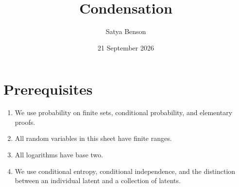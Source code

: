 \documentclass[11pt]{article}
\title{Condensation}
\author{Satya Benson}
\date{21 September 2026}
\begin{document}
\maketitle


\section{Prerequisites}
\label{sec:prerequisites}
\begin{enumerate}

\item We use probability on finite sets, conditional probability, and elementary
proofs.
\item All random variables in this sheet have finite ranges.
\item All logarithms
have base two.


\item We use conditional entropy,
conditional independence, and the distinction between an individual latent and
a collection of latents.
\end{enumerate}
\end{document}
